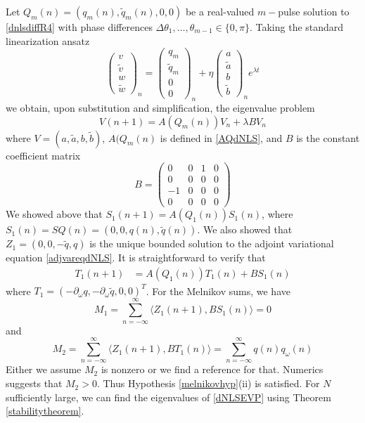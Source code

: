 \documentclass[12pt]{article}
\begin{document}
Let $Q_m(n) = (q_m(n), \tilde{q}_m(n), 0, 0)$ be a real-valued $m-$pulse solution to \eqref{dnlsdiffR4} with phase differences $\Delta \theta_1, \dots, \theta_{m-1} \in \{0, \pi\}$. Taking the standard linearization ansatz
\[
\begin{pmatrix}v \\ \tilde{v} \\ w \\ \tilde{w} \end{pmatrix}_n = 
\begin{pmatrix}q_m \\ \tilde{q}_m \\ 0 \\ 0 \end{pmatrix}_n + 
\eta \begin{pmatrix}a \\ \tilde{a} \\ b \\ \tilde{b} \end{pmatrix}_n e^{\lambda t}
\]
we obtain, upon substitution and simplification, the eigenvalue problem 
\begin{equation}\label{dNLSEVP}
V(n+1) = A(Q_m(n)) V_n + \lambda B V_n
\end{equation}
where $V = (a, \tilde{a}, b, \tilde{b})$, $A(Q_m(n)$ is defined in \eqref{AQdNLS}, and $B$ is the constant coefficient matrix 
\[
B = 
\begin{pmatrix}
0 & 0 & 1 & 0 \\
0 & 0 & 0 & 0 \\
-1 & 0 & 0 & 0 \\
0 & 0 & 0 & 0
\end{pmatrix}
\]
We showed above that $S_1(n+1) = A(Q_1(n)) S_1(n)$, where $S_1(n) = S Q(n) = (0, 0, q(n), \tilde{q}(n))$. We also showed that $Z_1 = (0, 0, -\tilde{q}, q)$ is the unique bounded solution to the adjoint variational equation \eqref{adjvareqdNLS}. It is straightforward to verify that 
\begin{align*}
T_1(n+1) &= A(Q_1(n)) T_1(n) + B S_1(n)
\end{align*}
where $T_1 = (-\partial_\omega q, -\partial_\omega \tilde{q}, 0, 0)^T$. For the Melnikov sums, we have
\[
M_1 = \sum_{n=-\infty}^\infty \langle Z_1(n+1), B S_1(n) \rangle = 0
\]
and
\[
M_2 = \sum_{n=-\infty}^\infty \langle Z_1(n+1), B T_1(n) \rangle =
\sum_{n=-\infty}^\infty q(n) q_\omega(n)
\]
Either we assume $M_2$ is nonzero or we find a reference for that. Numerics suggests that $M_2 > 0$. Thus Hypothesis \ref{melnikovhyp}(ii) is satisfied. For $N$ sufficiently large, we can find the eigenvalues of \eqref{dNLSEVP} using Theorem \ref{stabilitytheorem}. 
\end{document}

